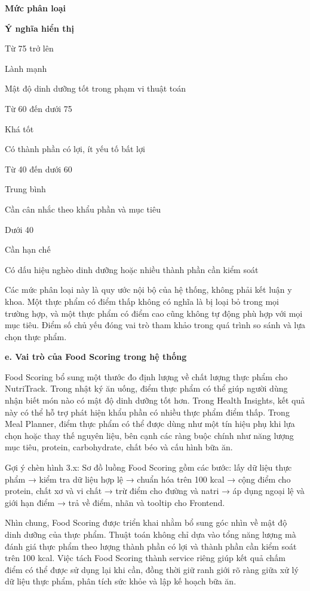 \textbf{Mức phân loại}

\textbf{Ý nghĩa hiển thị}

Từ 75 trở lên

Lành mạnh

Mật độ dinh dưỡng tốt trong phạm vi thuật toán

Từ 60 đến dưới 75

Khá tốt

Có thành phần có lợi, ít yếu tố bất lợi

Từ 40 đến dưới 60

Trung bình

Cần cân nhắc theo khẩu phần và mục tiêu

Dưới 40

Cần hạn chế

Có dấu hiệu nghèo dinh dưỡng hoặc nhiều thành phần cần kiểm soát

Các mức phân loại này là quy ước nội bộ của hệ thống, không phải kết luận y khoa. Một thực phẩm có điểm thấp không có nghĩa là bị loại bỏ trong mọi trường hợp, và một thực phẩm có điểm cao cũng không tự động phù hợp với mọi mục tiêu. Điểm số chủ yếu đóng vai trò tham khảo trong quá trình so sánh và lựa chọn thực phẩm.

\textbf{e. Vai trò của Food Scoring trong hệ thống}

Food Scoring bổ sung một thước đo định lượng về chất lượng thực phẩm cho NutriTrack. Trong nhật ký ăn uống, điểm thực phẩm có thể giúp người dùng nhận biết món nào có mật độ dinh dưỡng tốt hơn. Trong Health Insights, kết quả này có thể hỗ trợ phát hiện khẩu phần có nhiều thực phẩm điểm thấp. Trong Meal Planner, điểm thực phẩm có thể được dùng như một tín hiệu phụ khi lựa chọn hoặc thay thế nguyên liệu, bên cạnh các ràng buộc chính như năng lượng mục tiêu, protein, carbohydrate, chất béo và cấu hình bữa ăn.

Gợi ý chèn hình 3.x: Sơ đồ luồng Food Scoring gồm các bước: lấy dữ liệu thực phẩm → kiểm tra dữ liệu hợp lệ → chuẩn hóa trên 100 kcal → cộng điểm cho protein, chất xơ và vi chất → trừ điểm cho đường và natri → áp dụng ngoại lệ và giới hạn điểm → trả về điểm, nhãn và tooltip cho Frontend.

Nhìn chung, Food Scoring được triển khai nhằm bổ sung góc nhìn về mật độ dinh dưỡng của thực phẩm. Thuật toán không chỉ dựa vào tổng năng lượng mà đánh giá thực phẩm theo lượng thành phần có lợi và thành phần cần kiểm soát trên 100 kcal. Việc tách Food Scoring thành service riêng giúp kết quả chấm điểm có thể được sử dụng lại khi cần, đồng thời giữ ranh giới rõ ràng giữa xử lý dữ liệu thực phẩm, phân tích sức khỏe và lập kế hoạch bữa ăn.

